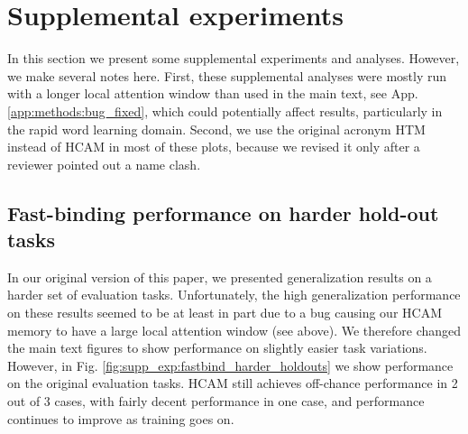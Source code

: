 \section{Supplemental experiments} \label{app:supp_exp}

In this section we present some supplemental experiments and analyses. However, we make several notes here. First, these supplemental analyses were mostly run with a longer local attention window than used in the main text, see App. \ref{app:methods:bug_fixed}, which could potentially affect results, particularly in the rapid word learning domain. Second, we use the original acronym HTM instead of HCAM in most of these plots, because we revised it only after a reviewer pointed out a name clash. 

\subsection{Fast-binding performance on harder hold-out tasks} \label{app:supp_exp:fastbind}
In our original version of this paper, we presented generalization results on a harder set of evaluation tasks. Unfortunately, the high generalization performance on these results seemed to be at least in part due to a bug causing our HCAM memory to have a large local attention window (see above). We therefore changed the main text figures to show performance on slightly easier task variations. However, in Fig. \ref{fig:supp_exp:fastbind_harder_holdouts} we show performance on the original evaluation tasks. HCAM still achieves off-chance performance in 2 out of 3 cases, with fairly decent performance in one case, and performance continues to improve as training goes on.

